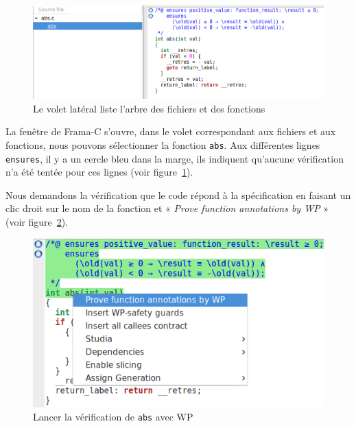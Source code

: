 \documentclass[12pt,francais,]{scrbook}
\newenvironment{Shaded}{}{}
\newcommand{\KeywordTok}[1]{\textcolor[rgb]{0.00,0.44,0.13}{\textbf{{#1}}}}
\newcommand{\NormalTok}[1]{{#1}}
\begin{document}
\begin{footnotesize}\begin{Shaded}
\end{Shaded}\end{footnotesize}

\begin{figure}[htbp]
\centering
\includegraphics[scale=0.5]{2-1-1-abs-1.png}
\caption{Le volet latéral liste l'arbre des fichiers et des fonctions}
\label{fig:2-1-1-abs-1}
\end{figure}

La fenêtre de Frama-C s'ouvre, dans le volet correspondant aux fichiers
et aux fonctions, nous pouvons sélectionner la fonction \texttt{abs}.
Aux différentes lignes \texttt{ensures}, il y a un cercle bleu dans la
marge, ils indiquent qu'aucune vérification n'a été tentée pour ces
lignes (voir figure~\ref{fig:2-1-1-abs-1}).

Nous demandons la vérification que le code répond à la spécification en
faisant un clic droit sur le nom de la fonction et « \emph{Prove
function annotations by WP} » (voir figure~\ref{fig:2-1-1-abs-2}).

\begin{figure}[htbp]
\centering
\includegraphics[scale=0.5]{2-1-1-abs-2.png}
\caption{Lancer la vérification de \texttt{abs} avec WP}
\label{fig:2-1-1-abs-2}
\end{figure}
\end{document}
